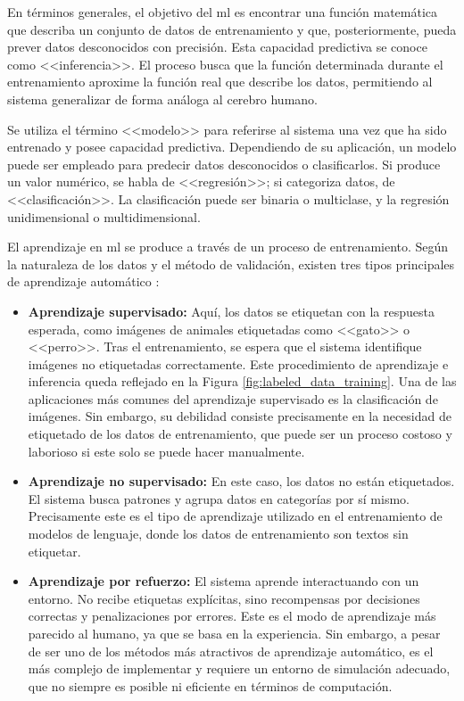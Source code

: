 En términos generales, el objetivo del \gls{ml} es encontrar una función matemática que describa un conjunto de datos de entrenamiento y que, posteriormente, pueda prever datos desconocidos con precisión. Esta capacidad predictiva se conoce como <<inferencia>>. El proceso busca que la función determinada durante el entrenamiento aproxime la función real que describe los datos, permitiendo al sistema generalizar de forma análoga al cerebro humano.

Se utiliza el término <<modelo>> para referirse al sistema una vez que ha sido entrenado y posee capacidad predictiva. Dependiendo de su aplicación, un modelo puede ser empleado para predecir datos desconocidos o clasificarlos. Si produce un valor numérico, se habla de <<regresión>>; si categoriza datos, de <<clasificación>>. La clasificación puede ser binaria o multiclase, y la regresión unidimensional o multidimensional.

El aprendizaje en \gls{ml} se produce a través de un proceso de entrenamiento. Según la naturaleza de los datos y el método de validación, existen tres tipos principales de aprendizaje automático \citep[p. ~38]{torresivinalsPythonDeepLearning2020}:

\begin{itemize}
    \item \textbf{Aprendizaje supervisado:} Aquí, los datos se etiquetan con la respuesta esperada, como imágenes de animales etiquetadas como <<gato>> o <<perro>>. Tras el entrenamiento, se espera que el sistema identifique imágenes no etiquetadas correctamente. Este procedimiento de aprendizaje e inferencia queda reflejado en la Figura \ref{fig:labeled_data_training}. Una de las aplicaciones más comunes del aprendizaje supervisado es la clasificación de imágenes. Sin embargo, su debilidad consiste precisamente en la necesidad de etiquetado de los datos de entrenamiento, que puede ser un proceso costoso y laborioso si este solo se puede hacer manualmente.
    
    \item \textbf{Aprendizaje no supervisado:} En este caso, los datos no están etiquetados. El sistema busca patrones y agrupa datos en categorías por sí mismo. Precisamente este es el tipo de aprendizaje utilizado en el entrenamiento de modelos de lenguaje, donde los datos de entrenamiento son textos sin etiquetar.
    
    \item \textbf{Aprendizaje por refuerzo:} El sistema aprende interactuando con un entorno. No recibe etiquetas explícitas, sino recompensas por decisiones correctas y penalizaciones por errores. Este es el modo de aprendizaje más parecido al humano, ya que se basa en la experiencia. Sin embargo, a pesar de ser uno de los métodos más atractivos de aprendizaje automático, es el más complejo de implementar y requiere un entorno de simulación adecuado, que no siempre es posible ni eficiente en términos de computación.
\end{itemize}

